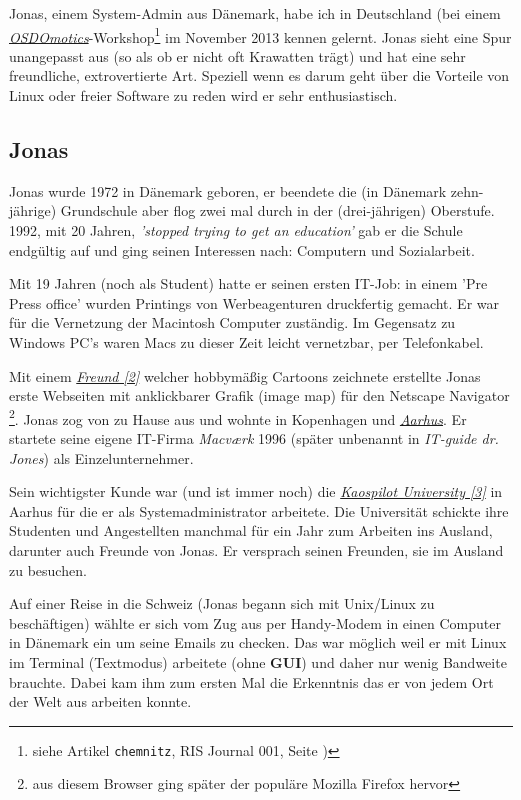 Jonas, einem System-Admin aus Dänemark, habe ich in Deutschland (bei einem \href{http://osdomotics.com}{\textit{OSDOmotics}}-Workshop\footnote{siehe Artikel \texttt{chemnitz}, RIS Journal 001, Seite \pageref{chemnitz})} im November 2013 kennen gelernt. Jonas sieht eine Spur unangepasst aus (so als ob er nicht oft Krawatten trägt) und hat eine sehr freundliche, extrovertierte Art. Speziell wenn es darum geht über die Vorteile von Linux oder freier Software zu reden wird er sehr enthusiastisch. 

\subsection*{Jonas}
Jonas wurde 1972 in Dänemark geboren, er beendete die (in Dänemark zehn-jährige) Grundschule aber flog zwei mal durch in der (drei-jährigen) Oberstufe. 1992, mit 20 Jahren,  \textit{'stopped trying to get an education'} gab er die Schule endgültig auf und ging seinen Interessen nach: Computern und Sozialarbeit.

Mit 19 Jahren (noch als Student) hatte er seinen ersten IT-Job: in einem 'Pre Press office' wurden Printings von Werbeagenturen druckfertig gemacht. Er war für die Vernetzung der Macintosh Computer zuständig. Im Gegensatz zu Windows PC's waren Macs zu dieser Zeit leicht vernetzbar, per Telefonkabel.

Mit einem \href{http://binx.com/}{\textit{Freund [2]}} welcher hobbymäßig Cartoons zeichnete erstellte Jonas erste Webseiten mit anklickbarer Grafik (image map) für den Netscape Navigator \footnote{aus diesem Browser ging später der populäre Mozilla Firefox hervor}. Jonas zog von zu Hause aus und wohnte in Kopenhagen und \href{https://en.wikipedia.org/wiki/Aarhus}{\textit{Aarhus}}. Er startete seine eigene IT-Firma \textit{Macværk} 1996 (später unbenannt in \textit{IT-guide dr. Jones}) als Einzelunternehmer.

Sein wichtigster Kunde war (und ist immer noch) die \href{http://kaospilot.dk/}{\textit{Kaospilot University [3]}} in Aarhus für die er als Systemadministrator arbeitete. Die Universität schickte ihre Studenten und Angestellten manchmal für ein Jahr zum Arbeiten ins Ausland, darunter auch Freunde von Jonas. Er versprach seinen Freunden, sie im Ausland zu besuchen.

Auf einer Reise in die Schweiz (Jonas begann sich mit Unix/Linux zu beschäftigen) wählte er sich vom Zug aus per Handy-Modem in einen Computer in Dänemark ein um seine Emails zu checken. Das war möglich weil er mit Linux im Terminal (Textmodus) arbeitete (ohne \textbf{GUI}) und daher nur wenig Bandweite brauchte. Dabei kam ihm zum ersten Mal die Erkenntnis das er von jedem Ort der Welt aus arbeiten konnte.

